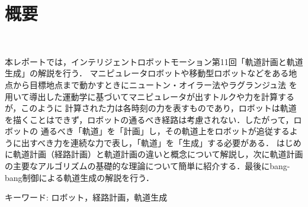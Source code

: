 \chapter*{概要}
\thispagestyle{empty}
%
\begin{center}
  \scalebox{1.5}{}\\
\end{center}
\vspace{1.0zh}
%

本レポートでは，インテリジェントロボットモーション第11回「軌道計画と軌道生成」の解説を行う．
マニピュレータロボットや移動型ロボットなどをある地点から目標地点まで動かすときにニュートン・オイラー法やラグランジュ法
を用いて導出した運動学に基づいてマニピュレータが出すトルクや力を計算するが，このように
計算された力は各時刻の力を表すものであり，ロボットは軌道を描くことはできず，ロボットの通るべき経路は考慮されない．したがって，ロボットの
通るべき「軌道」を「計画」し，その軌道上をロボットが追従するように出すべき力を連続な力で表し，「軌道」を「生成」する必要がある．
はじめに軌道計画（経路計画）と軌道計画の違いと概念について解説し，次に軌道計画の主要なアルゴリズムの基礎的な理論について簡単に紹介する．最後にbang-bang制御による軌道生成の解説を行う．

キーワード: ロボット，経路計画，軌道生成
